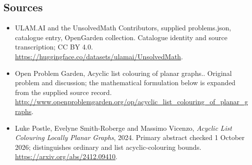 \documentclass[11pt,a4paper]{article}
\begin{document}
\subsection{Sources}
\begin{itemize}
\item[S1] ULAM.AI and the UnsolvedMath Contributors, supplied problems.json, catalogue entry, OpenGarden collection. Catalogue identity and source transcription; CC BY 4.0.
\url{https://huggingface.co/datasets/ulamai/UnsolvedMath}.
\item[S2] Open Problem Garden, Acyclic list colouring of planar graphs.. Original problem and discussion; the mathematical formulation below is expanded from the supplied source record.
\url{http://www.openproblemgarden.org/op/acyclic_list_colouring_of_planar_graphs}.

\item[R1] Luke Postle, Evelyne Smith-Roberge and Massimo Vicenzo,
\emph{Acyclic List Colouring Locally Planar Graphs}, 2024. Primary
abstract checked 1 October 2026; distinguishes ordinary and list
acyclic-colouring bounds.
\url{https://arxiv.org/abs/2412.09410}.

\end{itemize}
\end{document}

